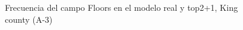 \begin{figure}[H]
    \centering
    
    \caption{Frecuencia del campo Floors en el modelo real y top2+1, King county (A-3)}
    \label{frecuency-top2+1-floors}
\end{figure}